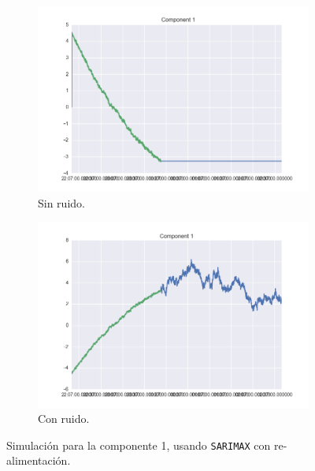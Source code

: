 \documentclass[11pt,spanish,listoffigures,listoftables]{tfgetsinf}
\begin{document}
        \begin{figure}[H]
            \centering
            \begin{subfigure}{0.49\textwidth}
                \includegraphics[width=\textwidth]{c1_pred_refeed_no_gaussian_no_noise.png}
                \caption{Sin ruido.}
                \label{fig:c1_pred_refeed_no_gaussian_no_noise}
            \end{subfigure}
            \begin{subfigure}[h]{0.49\textwidth}
                \includegraphics[width=\textwidth]{c1_no_gaussian_distance.png}
                \caption{Con ruido.}
                \label{fig:c1_no_gaussian_distance}
            \end{subfigure}
            \caption{Simulación para la componente 1, usando {\tt SARIMAX} con re-alimentación.}
            \label{fig:simulation_arima_gaussian}
        \end{figure}
        
\end{document}

